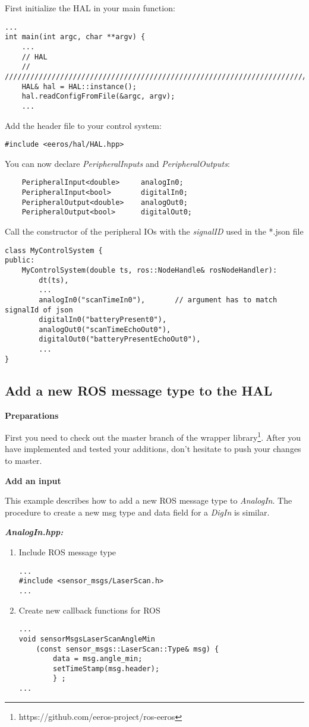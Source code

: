 First initialize the HAL in your main function:
\lstset{language=c}
\begin{lstlisting}
...
int main(int argc, char **argv) {
	...
	// HAL
	// ////////////////////////////////////////////////////////////////////////
	HAL& hal = HAL::instance();
	hal.readConfigFromFile(&argc, argv);
	...
\end{lstlisting}

Add the header file to your control system:
\lstset{language=c}
\begin{lstlisting}
#include <eeros/hal/HAL.hpp>
\end{lstlisting}

You can now declare \textit{PeripheralInputs} and \textit{PeripheralOutputs}:
\lstset{language=c}
\begin{lstlisting}
	PeripheralInput<double>		analogIn0;
	PeripheralInput<bool>		digitalIn0;
	PeripheralOutput<double>	analogOut0;
	PeripheralOutput<bool>		digitalOut0;
\end{lstlisting}

Call the constructor of the peripheral IOs with the \textit{signalID} used in the *.json file
\begin{lstlisting}
class MyControlSystem {
public:
	MyControlSystem(double ts, ros::NodeHandle& rosNodeHandler):
		dt(ts),
		...
		analogIn0("scanTimeIn0"),		// argument has to match signalId of json
		digitalIn0("batteryPresent0"),
		analogOut0("scanTimeEchoOut0"),
		digitalOut0("batteryPresentEchoOut0"),
		...
}
\end{lstlisting}


\subsection{Add a new ROS message type to the HAL}
\label{sectionImplementMsgType}
\textbf{Preparations}

First you need to check out the master branch of the wrapper library\footnote{https://github.com/eeros-project/ros-eeros}.
After you have implemented and tested your additions, don't hesitate to push your changes to master.


\textbf{Add an input}

This example describes how to add a new ROS message type to \textit{AnalogIn}.
The procedure to create a new msg type and data field for a \textit{DigIn} is similar.

\textbf{\textit{AnalogIn.hpp:}}
\begin{enumerate}[\hspace{0.5cm}1{.)}]
	\item Include ROS message type
	\lstset{language=c}
	\begin{lstlisting}
...
#include <sensor_msgs/LaserScan.h>
...
	\end{lstlisting}
	
	\item Create new callback functions for ROS
	\lstset{language=c}
	\begin{lstlisting}
...
void sensorMsgsLaserScanAngleMin
	(const sensor_msgs::LaserScan::Type& msg) {
		data = msg.angle_min;
		setTimeStamp(msg.header);
		} ;
...
\end{lstlisting}
\end{enumerate}

